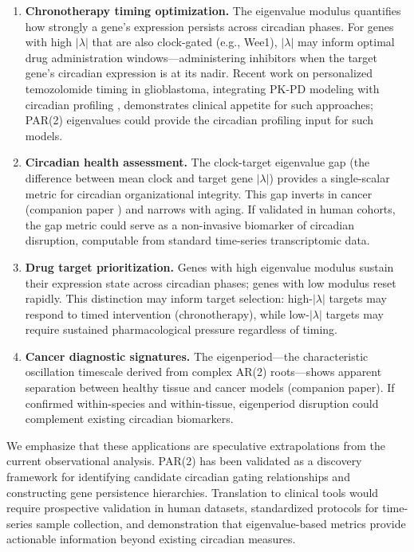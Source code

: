 \documentclass[11pt,letterpaper]{article}
\begin{document}
\begin{enumerate}[noitemsep]
    \item \textbf{Chronotherapy timing optimization.} The eigenvalue modulus quantifies how strongly a gene's expression persists across circadian phases. For genes with high $|\lambda|$ that are also clock-gated (e.g., Wee1), $|\lambda|$ may inform optimal drug administration windows---administering inhibitors when the target gene's circadian expression is at its nadir. Recent work on personalized temozolomide timing in glioblastoma, integrating PK-PD modeling with circadian profiling \citep{fujimoto2025}, demonstrates clinical appetite for such approaches; PAR(2) eigenvalues could provide the circadian profiling input for such models.
    \item \textbf{Circadian health assessment.} The clock-target eigenvalue gap (the difference between mean clock and target gene $|\lambda|$) provides a single-scalar metric for circadian organizational integrity. This gap inverts in cancer (companion paper \citep{whiteside2026paper2}) and narrows with aging. If validated in human cohorts, the gap metric could serve as a non-invasive biomarker of circadian disruption, computable from standard time-series transcriptomic data.
    \item \textbf{Drug target prioritization.} Genes with high eigenvalue modulus sustain their expression state across circadian phases; genes with low modulus reset rapidly. This distinction may inform target selection: high-$|\lambda|$ targets may respond to timed intervention (chronotherapy), while low-$|\lambda|$ targets may require sustained pharmacological pressure regardless of timing.
    \item \textbf{Cancer diagnostic signatures.} The eigenperiod---the characteristic oscillation timescale derived from complex AR(2) roots---shows apparent separation between healthy tissue and cancer models (companion paper). If confirmed within-species and within-tissue, eigenperiod disruption could complement existing circadian biomarkers.
\end{enumerate}

We emphasize that these applications are speculative extrapolations from the current observational analysis. PAR(2) has been validated as a discovery framework for identifying candidate circadian gating relationships and constructing gene persistence hierarchies. Translation to clinical tools would require prospective validation in human datasets, standardized protocols for time-series sample collection, and demonstration that eigenvalue-based metrics provide actionable information beyond existing circadian measures.
\end{document}
